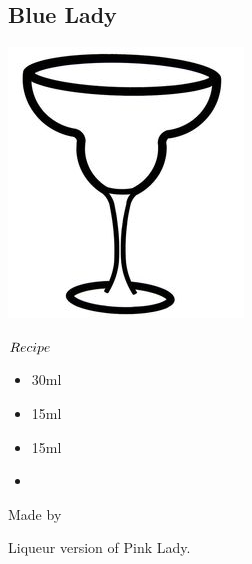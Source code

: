 \subsection{Blue Lady}
\vspace{-7mm}
\hspace{35mm}
\includegraphics[scale=.05]{cocktail_glass_snow.jpg}
\vspace{2.5mm}
\begin{itembox}[l]{\boldmath $Recipe$}
\begin{itemize}
\setlength{\parskip}{0cm}
\setlength{\itemsep}{0cm}
\item \bc 30ml
\item \gin 15ml
\item \lj 15ml
\item {}
\end{itemize}
\vspace{-4mm}
Made by \shake
\end{itembox}
Liqueur version of Pink Lady.
